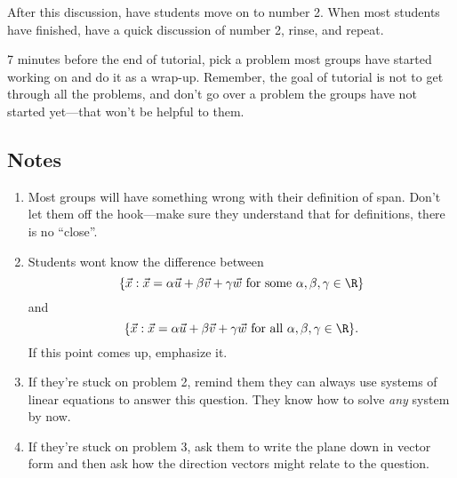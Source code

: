 	After this discussion, have students move on to number 2. When most students have finished,
		have a quick discussion of number 2, rinse, and repeat.
	
	7 minutes before the end of tutorial, pick a problem most groups have started working on
	and do it as a wrap-up. Remember, the goal of tutorial is not to get through all the problems,
	and don't go over a problem the groups have not started yet---that won't be helpful to them.


\subsection*{Notes}
		\begin{enumerate}
			\item Most groups will have something wrong with their definition of span.
				Don't let them off the hook---make sure they understand that for
				definitions, there is no ``close''.
			\item Students wont know the difference between
				\[
			\{\vec x:\vec x=\alpha\vec u+\beta\vec v+\gamma \vec w\text{ for some }\alpha,\beta,\gamma\in \R\}
				\]
				and
				\[
			\{\vec x:\vec x=\alpha\vec u+\beta\vec v+\gamma \vec w\text{ for all }\alpha,\beta,\gamma\in \R\}.
				\]
				If this point comes up, emphasize it.
			\item If they're stuck on problem 2, remind them they can always use systems of linear equations to answer
				this question. They know how to solve \emph{any} system by now.

			\item If they're stuck on problem 3, ask them to write the plane down in vector form and then
				ask how the direction vectors might relate to the question.
		\end{enumerate}
